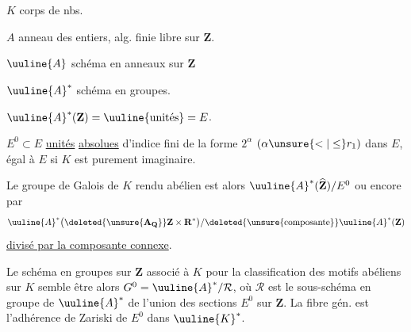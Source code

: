 $K$ corps de nbs.

$A$ anneau des entiers, alg. finie libre sur $\mathbf Z$.

$\uuline{A}$ schéma en anneaux sur $\mathbf Z$

$\uuline{A}^*$ schéma en groupes.

$\uuline{A}^*(\mathbf Z)=\uuline{\text{unités}}=E$.

$E^0\subset E$ \uline{unités} \uline{absolues} d'indice fini de la forme $2^\alpha$ $(\alpha\unsure{<|\leq}r_1)$ dans $E$, égal à $E$ si $K$ est purement imaginaire.

 Le groupe de Galois de $K$ rendu abélien est alors  $\uuline{A}^*(\widehat{\mathbf Z})/E^0$ ou encore par
\[
\uuline{A}^*\bigl(\deleted{\unsure{\mathbf A_{\mathbf Q}}}\mathbf Z\times\mathbf R^*\bigr)/\deleted{\text{\unsure{composante}}}\uuline{A}^*(\mathbf Z)
\]
\uline{divisé par la composante connexe}.

Le schéma en groupes  sur $\mathbf Z$ associé à $K$ pour la classification des motifs abéliens sur $K$ semble être alors $G^0=\uuline{A}^*/\mathcal R$, où $\mathcal R$ est le sous-schéma en groupe de $\uuline{A}^*$  de l'union des sections $E^0$ sur $\mathbf Z$. La fibre gén. est l'adhérence  de Zariski de $E^0$ dans $\uuline{K}^*$.
